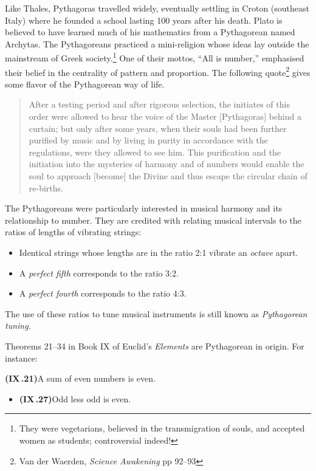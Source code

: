 Like Thales, Pythagoras travelled widely, eventually settling in Croton (southeast Italy) where he founded a school lasting 100 years after his death. Plato is believed to have learned much of his mathematics from a Pythagorean named Archytas.\smallbreak
The Pythagoreans practiced a mini-religion whose ideas lay outside the mainstream of Greek society.\footnote{%
They were vegetarians, believed in the transmigration of souls, and accepted women as students; controversial indeed!%
} One of their mottos, ``All is number,'' emphasised their belief in the centrality of pattern and proportion. The following quote\footnote{Van der Waerden, \emph{Science Awakening} pp 92--93} gives some flavor of the Pythagorean way of life.
\begin{quote}
  After a testing period and after rigorous selection, the initiates of this order were allowed to hear the voice of the Master [Pythagoras] behind a curtain; but only after some years, when their souls had been further purified by music and by living in purity in accordance with the regulations, were they allowed to see him. This purification and the initiation into the mysteries of harmony and of numbers would enable the soul to approach [become] the Divine and thus escape the circular chain of re-births.
\end{quote}

The Pythagoreans were particularly interested in musical harmony and its relationship to number. They are credited with relating musical intervals to the ratios of lengths of vibrating strings:\vspace{-3pt}
\begin{itemize}\itemsep0pt\label{pg:pythagtuning}
  \item Identical strings whose lengths are in the ratio 2:1 vibrate an \emph{octave} apart.
  \item A \emph{perfect fifth} corresponds to the ratio 3:2.
  \item A \emph{perfect fourth} corresponds to the ratio 4:3.
\end{itemize}\vspace{-3pt}
The use of these ratios to tune musical instruments is still known as \emph{Pythagorean tuning.}
\goodbreak

Theorems 21--34 in Book IX of Euclid's \emph{Elements} are Pythagorean in origin. For instance:

\begin{thm*}{}{}
  {\normalfont\textbf{(IX\,.21)}}\lstsp A sum of even numbers is even.\par\vspace{-8pt}
  \begin{itemize}
    \item[]{\normalfont\textbf{(IX\,.27)}}\lstsp Odd less odd is even.
  \end{itemize}
\end{thm*}


